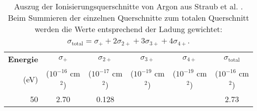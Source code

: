 \begin{samepage}
\begin{table}[H]
    \centering
    \caption[Auszug der Ionisierungsquerschnitte von Argon aus Straub et al.]{Auszug der Ionisierungsquerschnitte von Argon aus Straub et al. \cite{Straub}. Beim Summieren der einzelnen Querschnitte zum totalen Querschnitt werden die Werte entsprechend der Ladung gewichtet:
    $\sigma_{\text{total}} = \sigma_+ + 2\sigma_{2+} + 3\sigma_{3+} + 4\sigma_{4+}$.}
    \label{tab:argon}
    \small
    \begin{tabular}{r c c c c c}
        \toprule
        \textbf{Energie} & $\sigma_+$ & $\sigma_{2+}$ & $\sigma_{3+}$ & $\sigma_{4+}$ & $\sigma_{\text{total}}$ \\
        (eV) & ($10^{-16}$ cm$^2$) & ($10^{-17}$ cm$^2$) & ($10^{-19}$ cm$^2$) & ($10^{-19}$ cm$^2$) & ($10^{-16}$ cm$^2$) \\
        \midrule
        50  & 2.70   & 0.128  &        &        & 2.73   \\

\end{tabular}
\end{table}
\end{samepage}
